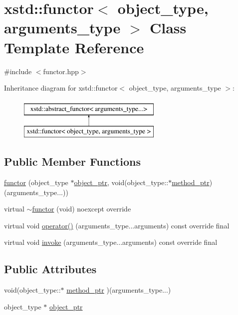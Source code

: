 \hypertarget{classxstd_1_1functor}{\section{xstd\-:\-:functor$<$ object\-\_\-type, arguments\-\_\-type $>$ Class Template Reference}
\label{classxstd_1_1functor}
}


{\ttfamily \#include $<$functor.\-hpp$>$}

Inheritance diagram for xstd\-:\-:functor$<$ object\-\_\-type, arguments\-\_\-type $>$\-:\begin{figure}[H]
\begin{center}
\leavevmode
\includegraphics[height=2.000000cm]{classxstd_1_1functor}
\end{center}
\end{figure}
\subsection*{Public Member Functions}
\begin{DoxyCompactItemize}
\item 
\hyperlink{classxstd_1_1functor_aed2d510d4df5f6bb33d06370fbfa5fb8}{functor} (object\-\_\-type $\ast$\hyperlink{classxstd_1_1functor_a919d42ea50702cf2ff02360f175b02ad}{object\-\_\-ptr}, void(object\-\_\-type\-::$\ast$\hyperlink{classxstd_1_1functor_a673d0ccf7da14d0d7f4726bbdf8af8a4}{method\-\_\-ptr})(arguments\-\_\-type...))
\item 
virtual \hyperlink{classxstd_1_1functor_af8e16a417ba32dccfbbef58d98858f50}{$\sim$functor} (void) noexcept override
\item 
virtual void \hyperlink{classxstd_1_1functor_aeb8b8bd83b493e203d526dbf6b0c4920}{operator()} (arguments\-\_\-type...\-arguments) const override final
\item 
virtual void \hyperlink{classxstd_1_1functor_aa40709e615299c2c2d05c8c21c7ace66}{invoke} (arguments\-\_\-type...\-arguments) const override final
\end{DoxyCompactItemize}
\subsection*{Public Attributes}
\begin{DoxyCompactItemize}
\item 
void(object\-\_\-type\-::$\ast$ \hyperlink{classxstd_1_1functor_a673d0ccf7da14d0d7f4726bbdf8af8a4}{method\-\_\-ptr} )(arguments\-\_\-type...)
\item 
object\-\_\-type $\ast$ \hyperlink{classxstd_1_1functor_a919d42ea50702cf2ff02360f175b02ad}{object\-\_\-ptr}
\end{DoxyCompactItemize}


